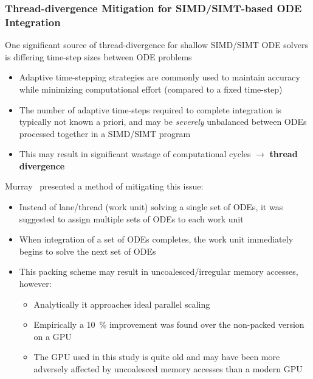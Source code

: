 \documentclass{beamer}
\begin{document}
\begin{frame}
 \frametitle{Thread-divergence Mitigation for SIMD\slash SIMT-based ODE Integration}
 {
 One significant source of thread-divergence for shallow SIMD\slash SIMT ODE solvers is differing time-step sizes between ODE problems
 \begin{itemize}
   \item Adaptive time-stepping strategies are commonly used to maintain accuracy while minimizing computational effort (compared to a fixed time-step)
   \item The number of adaptive time-steps required to complete integration is typically not known a priori, and may be \textit{severely} unbalanced between ODEs processed together in a SIMD\slash SIMT program
    \item This may result in significant wastage of computational cycles $\rightarrow$ \textbf{thread divergence}
 \end{itemize}
 }
 {
  Murray~ presented a method of mitigating this issue:
  \begin{itemize}
    \item Instead of lane\slash thread (work unit) solving a single set of ODEs, it was suggested to assign multiple sets of ODEs to each work unit
    \item When integration of a set of ODEs completes, the work unit immediately begins to solve the next set of ODEs
    \item This packing scheme may result in uncoalesced\slash irregular memory accesses, however:
    \begin{itemize}
     \item Analytically it approaches ideal parallel scaling
     \item Empirically a \SI{10}{\percent} improvement  was found over the non-packed version on a GPU
     \item The GPU used in this study is quite old and may have been more adversely affected by uncoalesced memory accesses than a modern GPU
    \end{itemize}
  \end{itemize}
 }
\end{frame}
\end{document}
